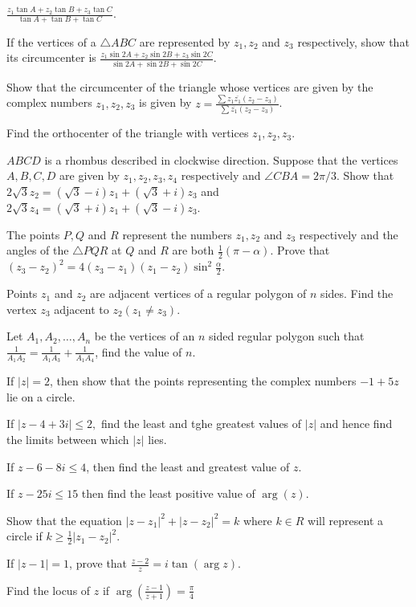   $\frac{z_1\tan A + z_2\tan B + z_3\tan C}{\tan A + \tan B + \tan C}$.
\item If the vertices of a $\triangle ABC$ are represented by $z_1, z_2$ and $z_3$ respectively, show that its
  circumcenter is $\frac{z_1\sin 2A + z_2\sin 2B + z_3\sin 2C}{\sin 2A + \sin 2B + \sin 2C}$.
\item Show that the circumcenter of the triangle whose vertices are given by the complex numbers $z_1, z_2, z_3$ is given
  by $z = \frac{\sum z_1\overline{z_1}(z_2 - z_3)}{\sum \overline{z_1}(z_2 - z_3)}$.
\item Find the orthocenter of the triangle with vertices $z_1, z_2, z_3$.
\item $ABCD$ is a rhombus described in clockwise direction. Suppose that the vertices $A, B, C, D$ are given by $z_1,
  z_2, z_3, z_4$ respectively and $\angle CBA = 2\pi/3$. Show that $2\sqrt{3}z_2 = (\sqrt{3} - i)z_1 + (\sqrt{3} + i)z_3$ and
  $2\sqrt{3}z_4 = (\sqrt{3} + i)z_1 + (\sqrt{3} - i)z_3$.
\item The points $P, Q$ and $R$ represent the numbers $z_1, z_2$ and $z_3$ respectively and the angles of the $\triangle
  PQR$ at $Q$ and $R$ are both $\frac{1}{2}(\pi - \alpha)$. Prove that $(z_3 - z_2)^2 = 4(z_3 - z_1)(z_1 -
  z_2)\sin^2\frac{\alpha}{2}$.
\item Points $z_1$ and $z_2$ are adjacent vertices of a regular polygon of $n$ sides. Find the vertex $z_3$ adjacent to
  $z_2(z_1\neq z_3)$.
\item Let $A_1, A_2, \ldots, A_n$ be the vertices of an $n$ sided regular polygon such that $\frac{1}{A_1A_2} =
  \frac{1}{A_1A_3} + \frac{1}{A_1A_4}$, find the value of $n$.
\item If $|z| = 2$, then show that the points representing the complex numbers $-1 + 5z$ lie on a circle.
\item If $|z - 4 + 3i|\leq 2,$ find the least and tghe greatest values of $|z|$ and hence find the limits between which
  $|z|$ lies.
\item If $z - 6 - 8i\leq 4$, then find the least and greatest value of $z$.
\item If $z - 25i\leq 15$ then find the least positive value of $\arg(z)$.
\item Show that the equation $|z - z_1|^2 + |z - z_2|^2 = k$ where $k\in R$ will represent a circle if $k\geq \frac{1}{2}|z_1 -
  z_2|^2$.
\item If $|z - 1| = 1$, prove that $\frac{z - 2}{z} = i\tan(\arg z)$.
\item Find the locus of $z$ if $\arg\left(\frac{z - 1}{z + 1}\right) = \frac{\pi}{4}$

